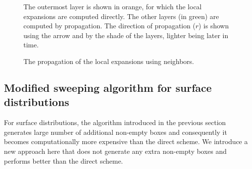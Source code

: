 \begin{figure}
\centering
{}
\caption{\small The outermost layer is shown in orange, for which the local expansions are computed directly. The other layers (in green) are computed by propagation. The direction of propagation ($r$) is shown using the arrow and by the shade of the layers, lighter being later in time.
}
\label{fig:sweep}
\end{figure}

\begin{figure}
\centering
{}
\caption{\small The propagation of the local expansions using neighbors. 
}
\label{fig:w2l}
\end{figure}

\subsection{Modified sweeping algorithm for surface distributions} 
\label{sec:mst}
For surface distributions, the algorithm introduced in the previous section generates large number of additional non-empty boxes and consequently it becomes computationally more expensive than the direct scheme. We introduce a new approach here that does not generate any extra non-empty boxes and performs better than the direct scheme. 

